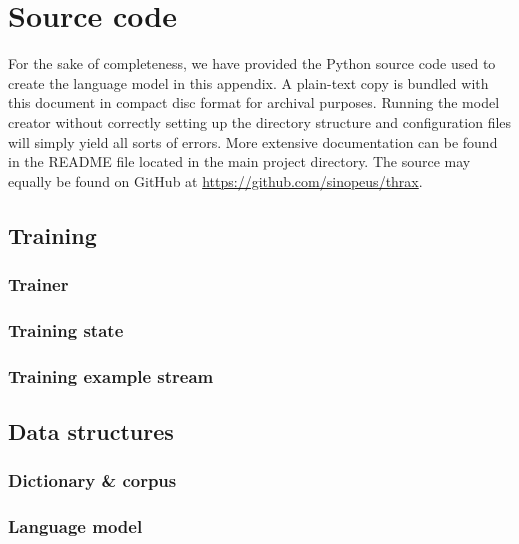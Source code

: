 \chapter{Source code}

For the sake of completeness, we have provided the Python source code
used to create the language model in this appendix. A plain-text copy
is bundled with this document in compact disc format for archival
purposes. Running the model creator without correctly setting up the
directory structure and configuration files will simply yield all
sorts of errors. More extensive documentation can be found in the
README file located in the main project directory. The source may
equally be found on GitHub at \url{https://github.com/sinopeus/thrax}.

\section{Training}
\subsection{Trainer}
\label{sec:trainer}

\subsection{Training state}
\label{sec:trainstate}

\subsection{Training example stream}
\label{sec:trainexamplestream}

\section{Data structures}
\subsection{Dictionary \& corpus}
\label{sec:dict}

\subsection{Language model}
\label{sec:langmodel}

